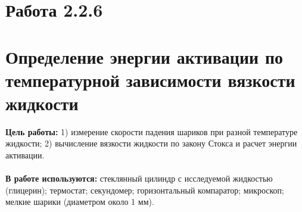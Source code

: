 \documentclass[12 pt, a4paper]{article}%
\begin{document}

\begin{center}
\section*{Работа 2.2.6}
    \section*{Определение энергии активации по температурной зависимости вязкости жидкости}
\end{center}
\textbf{Цель работы:} 1) измерение скорости падения шариков при разной температуре жидкости; 2) вычисление вязкости жидкости по закону Стокса и расчет энергии активации. \\ \\
\textbf{В работе используются:} стеклянный цилиндр с исследуемой жидкостью (глицерин); термостат; секундомер; горизонтальный компаратор; микроскоп; мелкие шарики (диаметром около 1 мм).
\end{document}
